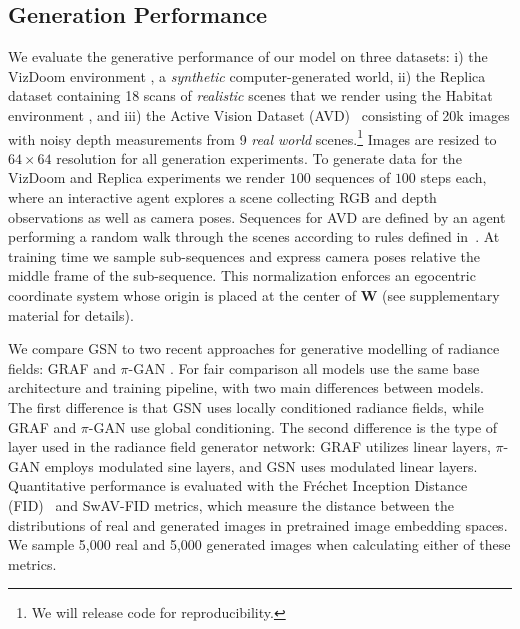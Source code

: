 \documentclass[10pt,twocolumn,letterpaper]{article}
\begin{document}
\subsection{Generation Performance}

We evaluate the generative performance of our model on three datasets: i) the VizDoom environment \cite{vizdoom}, a \textit{synthetic} computer-generated world, ii) the Replica dataset \cite{replica} containing 18 scans of \textit{realistic} scenes that we render using the Habitat environment \cite{habitat}, and iii) the Active Vision Dataset (AVD)~\cite{avd} consisting of 20k images with noisy depth measurements from 9 \textit{real world} scenes.\footnote{We will release 
code for reproducibility.} Images are resized to $64\times64$ resolution for all generation experiments. To generate data for the VizDoom and Replica experiments we render $100$ sequences of $100$ steps each, where an interactive agent explores a scene collecting RGB and depth observations as well as camera poses. Sequences for AVD are defined by an agent performing a random walk through the scenes according to rules defined in~\cite{iss}.
At training time we sample sub-sequences and express camera poses relative  the middle frame of the sub-sequence. This normalization enforces an egocentric coordinate system whose origin is placed at the center of $\textbf{W}$ (see supplementary material for details).

We compare GSN to two recent approaches for generative modelling of radiance fields: GRAF \cite{graf} and $\pi$-GAN \cite{pigan}. For fair comparison all models use the same base architecture and training pipeline, with two main differences between models. The first difference is that GSN uses locally conditioned radiance fields, while GRAF and $\pi$-GAN use global conditioning. The second difference is the type of layer used in the radiance field generator network: GRAF utilizes linear layers, $\pi$-GAN employs modulated sine layers, and GSN uses modulated linear layers. Quantitative performance is evaluated with the Fr\'{e}chet Inception Distance (FID)~\cite{fid} and SwAV-FID \cite{swavfid} metrics, which measure the distance between the distributions of real and generated images in pretrained image embedding spaces. We sample 5,000 real and 5,000 generated images when calculating either of these metrics.
\end{document}
